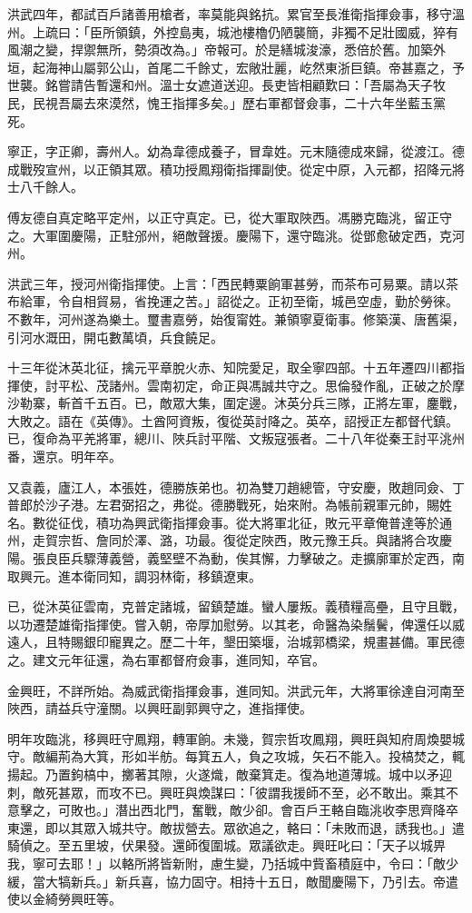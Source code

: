 \begin{pinyinscope}
洪武四年，都試百戶諸善用槍者，率莫能與銘抗。累官至長淮衛指揮僉事，移守溫州。上疏曰：「臣所領鎮，外控島夷，城池樓櫓仍陋襲簡，非獨不足壯國威，猝有風潮之變，捍禦無所，勢須改為。」帝報可。於是繕城浚濠，悉倍於舊。加築外垣，起海神山屬郭公山，首尾二千餘丈，宏敞壯麗，屹然東浙巨鎮。帝甚嘉之，予世襲。銘嘗請告暫還和州。溫士女遮道送迎。長吏皆相顧歎曰：「吾屬為天子牧民，民視吾屬去來漠然，愧王指揮多矣。」歷右軍都督僉事，二十六年坐藍玉黨死。

寧正，字正卿，壽州人。幼為韋德成養子，冒韋姓。元末隨德成來歸，從渡江。德成戰歿宣州，以正領其眾。積功授鳳翔衛指揮副使。從定中原，入元都，招降元將士八千餘人。

傅友德自真定略平定州，以正守真定。已，從大軍取陜西。馮勝克臨洮，留正守之。大軍圍慶陽，正駐邠州，絕敵聲援。慶陽下，還守臨洮。從鄧愈破定西，克河州。

洪武三年，授河州衛指揮使。上言：「西民轉粟餉軍甚勞，而茶布可易粟。請以茶布給軍，令自相貿易，省挽運之苦。」詔從之。正初至衛，城邑空虛，勤於勞徠。不數年，河州遂為樂土。璽書嘉勞，始復甯姓。兼領寧夏衛事。修築漢、唐舊渠，引河水溉田，開屯數萬頃，兵食饒足。

十三年從沐英北征，擒元平章脫火赤、知院愛足，取全寧四部。十五年遷四川都指揮使，討平松、茂諸州。雲南初定，命正與馮誠共守之。思倫發作亂，正破之於摩沙勒寨，斬首千五百。已，敵眾大集，圍定邊。沐英分兵三隊，正將左軍，鏖戰，大敗之。語在《英傳》。土酋阿資叛，復從英討降之。英卒，詔授正左都督代鎮。已，復命為平羌將軍，總川、陜兵討平階、文叛寇張者。二十八年從秦王討平洮州番，還京。明年卒。

又袁義，廬江人，本張姓，德勝族弟也。初為雙刀趙總管，守安慶，敗趙同僉、丁普郎於沙子港。左君弼招之，弗從。德勝戰死，始來附。為帳前親軍元帥，賜姓名。數從征伐，積功為興武衛指揮僉事。從大將軍北征，敗元平章俺普達等於通州，走賀宗哲、詹同於澤、潞，功最。復從定陜西，敗元豫王兵。與諸將合攻慶陽。張良臣兵驟薄義營，義堅壁不為動，俟其懈，力擊破之。走擴廓軍於定西，南取興元。進本衛同知，調羽林衛，移鎮遼東。

已，從沐英征雲南，克普定諸城，留鎮楚雄。蠻人屢叛。義積糧高壘，且守且戰，以功遷楚雄衛指揮使。嘗入朝，帝厚加慰勞。以其老，命醫為染鬚鬢，俾還任以威遠人，且特賜銀印寵異之。歷二十年，墾田築堰，治城郭橋梁，規畫甚備。軍民德之。建文元年征還，為右軍都督府僉事，進同知，卒官。

金興旺，不詳所始。為威武衛指揮僉事，進同知。洪武元年，大將軍徐達自河南至陜西，請益兵守潼關。以興旺副郭興守之，進指揮使。

明年攻臨洮，移興旺守鳳翔，轉軍餉。未幾，賀宗哲攻鳳翔，興旺與知府周煥嬰城守。敵編荊為大箕，形如半舫。每箕五人，負之攻城，矢石不能入。投槁焚之，輒揚起。乃置鉤槁中，擲著其隙，火遂熾，敵棄箕走。復為地道薄城。城中以矛迎刺，敵死甚眾，而攻不已。興旺與煥謀曰：「彼謂我援師不至，必不敢出。乘其不意擊之，可敗也。」潛出西北門，奮戰，敵少卻。會百戶王輅自臨洮收李思齊降卒東還，即以其眾入城共守。敵拔營去。眾欲追之，輅曰：「未敗而退，誘我也。」遣騎偵之。至五里坡，伏果發。還師復圍城。眾議欲走。興旺叱曰：「天子以城畀我，寧可去耶！」以輅所將皆新附，慮生變，乃括城中貲畜積庭中，令曰：「敵少緩，當大犒新兵。」新兵喜，協力固守。相持十五日，敵聞慶陽下，乃引去。帝遣使以金綺勞興旺等。


\end{pinyinscope}
